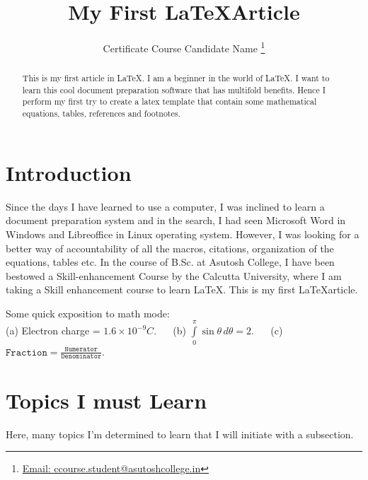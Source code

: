 \documentclass[onecolumn,12pt]{article}
\title{\bf My First \LaTeX Article}
\author{Certificate Course Candidate Name \thanks{\href{mailto:ccourse.student@gmail.com}{Email: ccourse.student@asutoshcollege.in}}}
\affil{Department of Physics, Asutosh College, Kolkata 700026, India}
\begin{document}
\maketitle

\begin{abstract}
This is my first article in \LaTeX. I am a beginner in the world of \LaTeX.
I want to learn this cool document preparation software that has multifold benefits. Hence I perform my first try to create a latex template that contain some mathematical equations, tables, references and footnotes.  
\end{abstract}

\section{Introduction}
\label{intro}
Since the days I have learned to use a computer, I was inclined to learn a document preparation system and in the search, I had seen Microsoft Word in Windows and Libreoffice in Linux operating system. However, I was looking for a better way of accountability of all the macros, citations, organization of the equations, tables etc. In the course of B.Sc. at Asutosh College, I have been bestowed a Skill-enhancement Course by the Calcutta University, where I am taking a Skill enhancement course to learn \LaTeX\cite{leslam}. This is my first \LaTeX article. \\ 
\noindent

Some quick exposition to math mode: \\
(a) Electron charge = $1.6 \times 10^{-9} C$. ~~ 
(b) $\displaystyle{\int\limits_0 ^ \pi \sin \theta\, d\theta} = 2$. ~~ 
(c) $\texttt{Fraction} = \frac{\texttt{Numerator}}{\texttt{Denominator}}$.


\section{Topics I must Learn}
\label{sec:1}
Here, many topics I'm determined to learn that I will initiate with a subsection.
\end{document}
